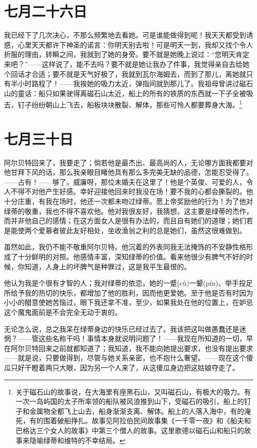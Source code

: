 \documentclass[12pt,oneside]{book}
\begin{document}
\chapter{七月二十六日}
我已经下了几次决心，不那么频繁地去看她。可是谁能做得到呢！我天天都受到诱惑，心里天天都许下神圣的诺言：你明天别去啦！可是明天一到，我却又找个令人折服的理由，转瞬之间，我就到了她的身旁。要不就是她晚上说过：“您明天肯定来吧？”——这样说了，能不去吗？要不就是她让我办了件事，我觉得亲自去给她个回话才合适；要不就是天气好极了，我就到瓦尔海姆去，而到了那儿，离她就只有半小时路程了！——我挨她的吸力太近，弹指间就到那儿了。我祖母曾讲过磁石山的童话：船只如果驶得离磁石山太近，船上的所有的铁质的东西就一下子全被吸去，钉子纷纷朝山上飞去，船板块块散裂、解体，那些可怜人都要葬身大海。\footnote{关于磁石山的故事说，在大海里有座黑石山，又叫磁石山，有极大的吸力。有一次一岛屿国的太子所率领的船队被风浪推到山下，受磁石的吸引，船上的钉子和金属物全都飞上山去，船身渐渐支离、解体。船上的人落入海中，有的淹死，有的围着破船挣扎。故事见阿拉伯民间故事集《一千零一夜》和《船夫和巴格达三个女人的故事》中第三个僧人的故事。这里歌德以磁石山和船只的故事来隐喻绿蒂和维特的不幸结局。}


\chapter{七月三十日}
阿尔贝特回来了，我要走了；倘若他是最杰出、最高尚的人，无论哪方面我都要对他甘拜下风的话，那么我亲眼目睹他具有那么多完美无缺的品德，怎能忍受得了。——占有！——够了。威廉呀，那位未婚夫在这里了！他是个英俊、可爱的人，令人不得不对他产生好感。幸好迎接他回来时我没在场！要不我的心都会撕裂的。他十分庄重，有我在场时，他还一次都未吻过绿蒂。愿上帝奖励他的行为！为了他对绿蒂的敬重，我也不得不喜欢他。他对我很友好，我猜想，这主要是绿蒂的杰作，而并非他自己的感情；在这方面女人是很有办法的，而且自有她们的道理；她们若是能使两个爱慕者彼此友好相处，坐收渔翁之利的总是她们，虽然这很难做到。

虽然如此，我仍不能不敬重阿尔贝特。他沉着的外表同我无法掩饰的不安静性格形成了十分鲜明的对照。他感情丰富，深知绿蒂的价值。看来他很少有脾气不好的时候，你知道，人身上的坏脾气是种罪过，这是我平生最恨的。

他认为我是个很有才智的人；我对绿蒂的依恋，她的一蹙(cù)一颦(pín)、举手投足所给予我的热切的快乐，都增加了他的胜利，因而他更爱她。至于他是否有时因为小小的醋意使她苦恼过，眼下我还拿不准，至少，如果我处在他的位置上，在妒忌这个魔鬼面前是不会完全无动于衷的。

无论怎么说，总之我呆在绿蒂身边的快乐已经过去了。我该把这叫做愚蠢还是迷惘？——管这些名称干吗！事情本身就说明问题了！——我现在所知道的一切，早在阿尔贝特回来之前就都知道了；我知道，我不能向她提出要求，也没有提出要求——就是说，只要做得到，尽管与她关系亲密，也不抱什么奢望。——现在这个傻瓜只好干瞪着两只大眼，因为另一个人来了，从这傻瓜身边把这姑娘夺走了。
\end{document}
